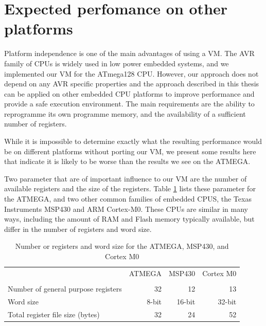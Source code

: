 \section{Expected perfomance on other platforms}
\label{sec-evaluation-other-platforms}
Platform independence is one of the main advantages of using a VM. The AVR family of CPUs is widely used in low power embedded systems, and we implemented our VM for the ATmega128 CPU. However, our approach does not depend on any AVR specific properties and the approach described in this thesis can be applied on other embedded CPU platforms to improve performance and provide a safe execution environment. The main requirements are the ability to reprogramme its own programme memory, and the availability of a sufficient number of registers.

While it is impossible to determine exactly what the resulting performance would be on different platforms without porting our VM, we present some results here that indicate it is likely to be worse than the results we see on the ATMEGA.

Two parameter that are of important influence to our VM are the number of available registers and the size of the registers. Table \ref{tbl-atmega-msp430-m0-registers} lists these parameter for the ATMEGA, and two other common families of embedded CPUS, the Texas Instruments MSP430 and ARM Cortex-M0. These CPUs are similar in many ways, including the amount of RAM and Flash memory typically available, but differ in the number of registers and word size.

\begin{table}
\centering
\caption{Number or registers and word size for the ATMEGA, MSP430, and Cortex M0}
\label{tbl-atmega-msp430-m0-registers}
\begin{tabular}{lrrr}
\toprule
                                       & ATMEGA       & MSP430     & Cortex M0 \\
                                       & \cite{Atmel:ATMEGA128Datasheet, Atmel:AVRInstructionSetManual}
                                       &  \cite{TexasInstrumentsIncorporated:MSP430F1611Datasheet, TexasInstrumentsIncorporated:MSP430x1xxUsersGuide}
                                       & \cite{ARM:2009vz} \\
\midrule
Number of general purpose registers    & 32           & 12         & 13        \\
Word size                              & 8-bit        & 16-bit     & 32-bit    \\
Total register file size (bytes)       & 32           & 24         & 52        \\
\end{tabular}
\end{table}


